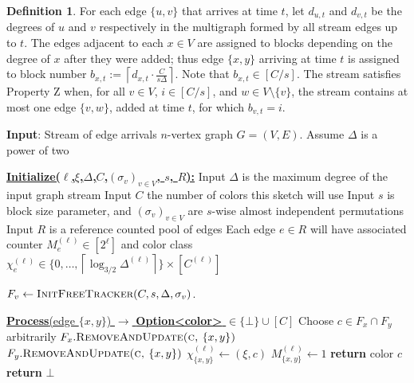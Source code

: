 \documentclass[10pt]{article}
\theoremstyle{definition}\newtheorem{definition}[lemma]{Definition}
\theoremstyle{remark}  \newtheorem*{remark}{Remark}
\newcommand{\ceil}[1]{{\left\lceil{#1}\right\rceil}}
\newcommand{\pell}{{(\ell)}} %
\newcommand{\pellxi}{{(\ell,\xi)}} %
\begin{document}
\begin{definition}  For each edge $\{u,v\}$ that arrives at time $t$,
  let $d_{u,t}$ and $d_{v,t}$ be the degrees of $u$ and $v$ respectively in the multigraph
  formed by all stream edges up to $t$. The edges adjacent to each $x \in V$ are assigned
  to blocks depending on the degree of $x$ after they were added; thus edge $\{x,y\}$ arriving
  at time $t$ is assigned to block number $b_{x,t} := \ceil{d_{x,t} \cdot \frac{C}{s \Delta}}$.
  Note that $b_{x,t} \in [C/s]$. The stream satisfies Property Z when, for all
  $v \in V$, $i \in [C/s]$, and $w \in V \setminus \{v\}$, the stream contains at most
  one edge $\{v,w\}$, added at time $t$, for which $b_{v,t} = i$.
\end{definition}

\begin{algorithm}[htb!]
  \caption{Partial coloring algorithm: $(1/3)$-partial $O(\Delta)$ edge coloring for graph edge arrival streams satisfying Property Z, plus reference counting\label{alg:det-ea-partial}}
  \begin{algorithmic}[1]
  \Statex \textbf{Input}: Stream of edge arrivals $n$-vertex graph $G=(V,E)$. 
    \Statex Assume $\Delta$ is a power of two %

    \Statex
    \Statex \underline{\textbf{Initialize($\ell$,$\xi$,$\Delta$,$C$,$(\sigma_v)_{v \in V}$, $s$, $R$):}}
      \Statex Input $\Delta$ is the maximum degree of the input graph stream
      \Statex Input $C$ the number of colors this sketch will use
      \Statex Input $s$ is block size parameter, and $(\sigma_v)_{v \in V}$ are $s$-wise almost independent permutations
      \Statex Input $R$ is a reference counted pool of edges
      \Statex Each edge $e \in R$ will have associated counter $M^\pell_{e} \in [2^\ell]$ and color class $\chi^\pell_{e} \in \{0,\ldots,\ceil{\log_{3/2}{\Delta^\pell}}\} \times [C^\pell]$

        \State $F_v \gets \textsc{InitFreeTracker}(C,s,\Delta,\sigma_v)$. \Comment{Also referred to as: $F^\pellxi_v$}
      \EndFor
    
  \Statex 
  \Statex\underline{\textbf{Process}(edge $\{x,y\}$) $\rightarrow$ \textbf{Option<color>} $\in \{\bot\} \cup [C]$}
    \label{step:layer-color-test}
      \State Choose $c \in F_x \cap F_y$ arbitrarily\label{step:layer-color-choice}
      \State $F_x.\textsc{RemoveAndUpdate(c, $\{x,y\}$)}$ 
      \State $F_y.\textsc{RemoveAndUpdate(c, $\{x,y\}$)}$
      \State $\chi^\pell_{\{x,y\}} \gets (\xi,c)$
      \State $M^\pell_{\{x,y\}} \gets 1$
      \State \textbf{return} color $c$
    \Else
      \State \textbf{return} $\bot$
    \EndIf
  \end{algorithmic}
\end{algorithm}
  
\end{document}
